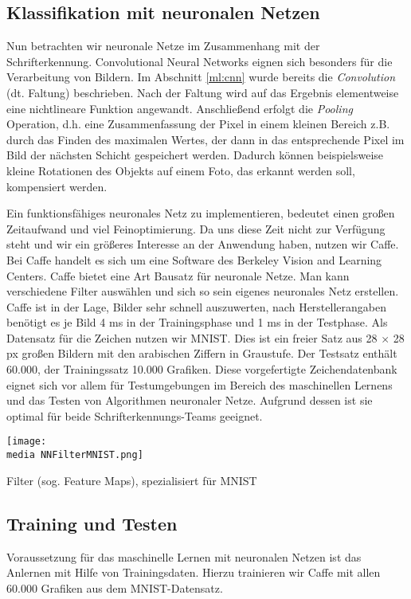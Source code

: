 \subsection{Klassifikation mit neuronalen Netzen}
Nun betrachten wir neuronale Netze im Zusammenhang mit der Schrifterkennung. Convolutional Neural Networks eignen sich besonders für die Verarbeitung von Bildern. 
Im Abschnitt \ref{ml:cnn} wurde bereits die \emph{Convolution} (dt. Faltung) beschrieben. 
Nach der Faltung wird auf das Ergebnis elementweise eine nichtlineare Funktion angewandt. Anschlie\ss end erfolgt die \emph{Pooling} Operation, d.h. eine Zusammenfassung der Pixel in einem kleinen Bereich z.B. durch das Finden des maximalen Wertes, der dann in das entsprechende Pixel im Bild der n\"achsten Schicht gespeichert werden. Dadurch können beispielsweise kleine Rotationen des Objekts auf einem Foto, das erkannt werden soll, kompensiert werden.

Ein funktionsfähiges neuronales Netz zu implementieren, bedeutet einen großen Zeitaufwand und viel Feinoptimierung. Da uns diese Zeit nicht zur Verfügung steht und wir ein größeres Interesse an der Anwendung haben, nutzen wir Caffe. Bei Caffe handelt es sich um eine Software des Berkeley Vision and Learning Centers. Caffe bietet eine Art Bausatz für neuronale Netze. Man kann verschiedene Filter auswählen und sich so sein eigenes neuronales Netz erstellen. Caffe ist in der Lage, Bilder sehr schnell auszuwerten, nach Herstellerangaben benötigt es je Bild 4 ms in der Trainingsphase und 1 ms in der Testphase.
Als Datensatz für die Zeichen nutzen wir MNIST. Dies ist ein freier Satz aus 28 $\times$ 28 px großen Bildern mit den arabischen Ziffern in Graustufe. Der Testsatz enthält 60.000, der Trainingssatz 10.000 Grafiken. Diese vorgefertigte Zeichendatenbank eignet sich vor allem für Testumgebungen im Bereich des maschinellen Lernens und das Testen von Algorithmen neuronaler Netze. Aufgrund dessen ist sie optimal für beide Schrifterkennungs-Teams geeignet.
\begin{dsafigure}
\begin{center}
	\texttt{[image: \\media NNFilterMNIST.png]}
	\caption{Filter (sog. Feature Maps), spezialisiert für MNIST}
	\label{NNFilterMNIST}
\end{center}
\end{dsafigure}

\subsection{Training und Testen}
Voraussetzung für das maschinelle Lernen mit neuronalen Netzen ist das Anlernen mit Hilfe von Trainingsdaten. Hierzu trainieren wir Caffe mit allen 60.000 Grafiken aus dem MNIST-Datensatz.

